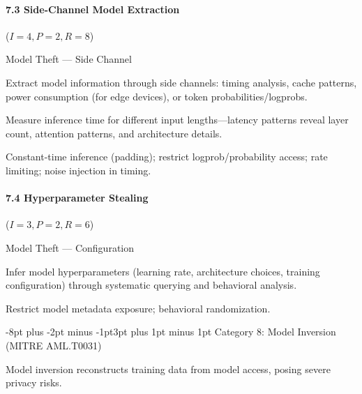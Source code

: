 \documentclass[conference]{IEEEtran}
\makeatletter
\renewcommand{\subsection}{\@startsection{subsection}{2}{\z@}%
  {-8pt plus -2pt minus -1pt}{3pt plus 1pt minus 1pt}%
  {\normalfont\normalsize\bfseries\sffamily\color{accentblue}}}
\newenvironment{attackentry}{\begin{description}[style=unboxed,leftmargin=0cm,itemsep=1pt,parsep=1pt,topsep=2pt,font=\sffamily\small\color{accentdark}]}{\end{description}}
\makeatother
\begin{document}
\paragraph{7.3 Side-Channel Model Extraction} ($I{=}4, P{=}2, R{=}8$)
\begin{attackentry}
\item[Category:] Model Theft --- Side Channel
\item[How it works:] Extract model information through side channels: timing analysis, cache patterns, power consumption (for edge devices), or token probabilities/logprobs.
\item[Example:] Measure inference time for different input lengths---latency patterns reveal layer count, attention patterns, and architecture details.
\item[Mitigations:] Constant-time inference (padding); restrict logprob/probability access; rate limiting; noise injection in timing.
\end{attackentry}

\paragraph{7.4 Hyperparameter Stealing} ($I{=}3, P{=}2, R{=}6$)
\begin{attackentry}
\item[Category:] Model Theft --- Configuration
\item[How it works:] Infer model hyperparameters (learning rate, architecture choices, training configuration) through systematic querying and behavioral analysis.
\item[Mitigations:] Restrict model metadata exposure; behavioral randomization.
\end{attackentry}

\subsection{Category 8: Model Inversion (MITRE AML.T0031)}

Model inversion reconstructs training data from model access, posing severe privacy risks.
\end{document}
